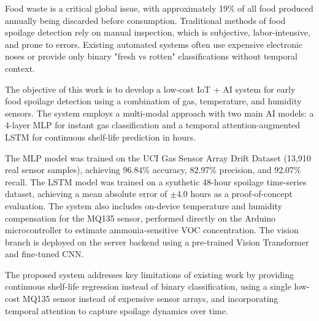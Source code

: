 \vspace{-1cm}


Food waste is a critical global issue, with approximately 19\% of all food produced annually being discarded before consumption. Traditional methods of food spoilage detection rely on manual inspection, which is subjective, labor-intensive, and prone to errors. Existing automated systems often use expensive electronic noses or provide only binary "fresh vs rotten" classifications without temporal context.

The objective of this work is to develop a low-cost IoT + AI system for early food spoilage detection using a combination of gas, temperature, and humidity sensors. The system employs a multi-modal approach with two main AI models: a 4-layer MLP for instant gas classification and a temporal attention-augmented LSTM for continuous shelf-life prediction in hours.

The MLP model was trained on the UCI Gas Sensor Array Drift Dataset (13,910 real sensor samples), achieving 96.84\% accuracy, 82.97\% precision, and 92.07\% recall. The LSTM model was trained on a synthetic 48-hour spoilage time-series dataset, achieving a mean absolute error of $\pm$4.0 hours as a proof-of-concept evaluation. The system also includes on-device temperature and humidity compensation for the MQ135 sensor, performed directly on the Arduino microcontroller to estimate ammonia-sensitive VOC concentration. The vision branch is deployed on the server backend using a pre-trained Vision Transformer and fine-tuned CNN.

The proposed system addresses key limitations of existing work by providing continuous shelf-life regression instead of binary classification, using a single low-cost MQ135 sensor instead of expensive sensor arrays, and incorporating temporal attention to capture spoilage dynamics over time.

\pagebreak
